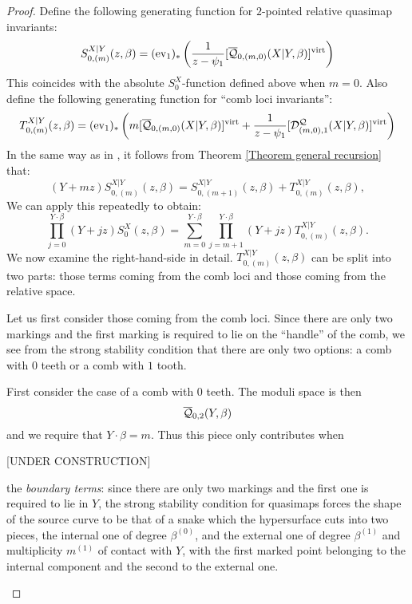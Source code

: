 \begin{proof}
Define the following generating function for $2$-pointed relative quasimap invariants:
 \[
  S_{0,(m)}^{X|Y}(z,\beta)=(\operatorname{ev}_1)_*\left(\frac{1}{z-\psi_1}[\overline{\mathcal Q}_{0,(m,0)}(X|Y,\beta)]^{\operatorname{virt}}\right)
 \]
This coincides with the absolute $S_0^X$-function defined above when $m=0$. Also define the following generating function for ``comb loci invariants'':
\[
 T_{0,(m)}^{X|Y}(z,\beta)=(\operatorname{ev}_1)_*\left(m [\overline{\mathcal Q}_{0,(m,0)}(X|Y,\beta)]^{\operatorname{virt}}+\frac{1}{z-\psi_1} [\mathcal{D}^{\mathcal{Q}}_{(m,0),1}(X|Y,\beta)]^{\operatorname{virt}} \right)
\]
In the same way as in \cite[Lemma 1.2]{Ga-MF}, it follows from Theorem \ref{Theorem general recursion} that:
\begin{equation}\label{eqn:G}
 (Y+mz) S_{0,(m)}^{X|Y}(z,\beta) = S_{0,(m+1)}^{X|Y}(z,\beta)+ T_{0,(m)}^{X|Y}(z,\beta),
\end{equation}
We can apply this repeatedly to obtain:
\[
 \prod_{j=0}^{Y\cdot\beta}(Y+jz) S_0^X(z,\beta) = \sum_{m=0}^{Y\cdot\beta}\prod_{j=m+1}^{Y\cdot\beta}(Y+jz)T_{0,(m)}^{X|Y}(z,\beta).
\]
We now examine the right-hand-side in detail. $T_{0,(m)}^{X|Y}(z,\beta)$ can be split into two parts: those terms coming from the comb loci and those coming from the relative space.

Let us first consider those coming from the comb loci. Since there are only two markings and the first marking is required to lie on the ``handle'' of the comb, we see from the strong stability condition that there are only two options: a comb with $0$ teeth or a comb with $1$ tooth.

First consider the case of a comb with $0$ teeth. The moduli space is then
\begin{equation*} \overline{\mathcal Q}_{0,2}(Y,\beta) \end{equation*}
and we require that $Y \cdot \beta = m$. Thus this piece only contributes when 

[UNDER CONSTRUCTION]

the \emph{boundary terms}: since there are only two markings and the first one is required to lie in $Y$, the strong stability condition for quasimaps forces the shape of the source curve to be that of a snake which the hypersurface cuts into two pieces, the internal one of degree $\beta^{(0)}$, and the external one of degree $\beta^{(1)}$ and multiplicity $m^{(1)}$ of contact with $Y$, with the first marked point belonging to the internal component and the second to the external one.

\begin{center}

\end{center}
 

\end{proof}
